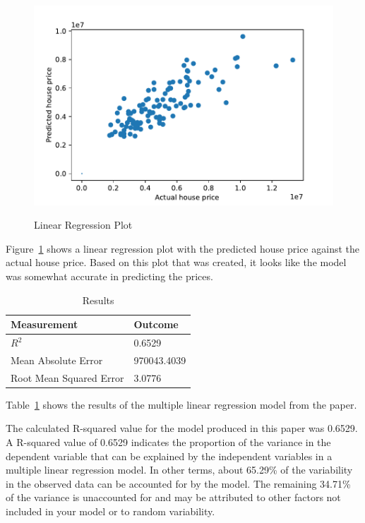 \documentclass[12pt]{article}
\begin{document}
\begin{figure}[h!]
    \caption{Linear Regression Plot}
    \includegraphics[width=1\textwidth]{linear_regression_plot.pdf}
    \label{fig:regression_plot}
\end{figure}
Figure~\ref{fig:regression_plot} shows a linear regression plot with the predicted house price against the actual house price. Based on this plot that was created, it looks like the model was somewhat accurate in predicting the prices. 

\begin{table}[h!]
\caption{Results}
  \label{tab:re}
 \begin{center} 
\begin{tabular}{ll}
  \toprule
Measurement & Outcome \\
  \midrule
\(R^2\) & 0.6529 \\ 
Mean Absolute Error & 970043.4039 \\
Root Mean Squared Error & 3.0776 \\
   \bottomrule
\end{tabular}\par
\end{center}
\end{table}
Table~\ref{tab:re} shows the results of the multiple linear regression model from the paper.

The calculated R-squared value for the model produced in this paper was 0.6529. A R-squared value of 0.6529 indicates the proportion of the variance in the dependent variable that can be explained by the independent variables in a multiple linear regression model. In other terms, about 65.29\% of the variability in the observed data can be accounted for by the model. The remaining 34.71\% of the variance is unaccounted for and may be attributed to other factors not included in your model or to random variability.
\end{document}
